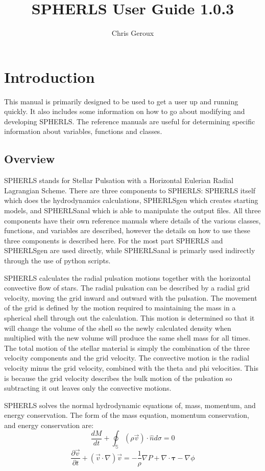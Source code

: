 \documentclass[12pt,a4paper]{book}
\title{SPHERLS User Guide 1.0.3}
\author{Chris Geroux}
\begin{document}
\maketitle
\chapter{Introduction}
\label{chap:introduction}
This manual is primarily designed to be used to get a user up and running quickly. It also includes some information on how to go about modifying and developing SPHERLS. The reference manuals are useful for determining specific information about variables, functions and classes.

\section{Overview}
\label{sec:overview}
SPHERLS stands for Stellar Pulsation with a Horizontal Eulerian Radial Lagrangian Scheme. There are three components to SPHERLS: SPHERLS itself which does the hydrodynamics calculations, SPHERLSgen which creates starting models, and SPHERLSanal which is able to manipulate the output files. All three components have their own reference manuals where details of the various classes, functions, and variables are described, however the details on how to use these three components is described here. For the most part SPHERLS and SPHERLSgen are used directly, while SPHERLSanal is primarly used indirectly through the use of python scripts.
  
SPHERLS calculates the radial pulsation motions together with the horizontal convective flow of stars. The radial pulsation can be described by a radial grid velocity, moving the grid inward and outward with the pulsation. The movement of the grid is defined by the motion required to maintaining the mass in a spherical shell through out the calculation. This motion is determined so that it will change the volume of the shell so the newly calculated density when multiplied with the new volume will produce the same shell mass for all times. The total motion of the stellar material is simply the combination of the three velocity components and the grid velocity.  The convective motion is the radial velocity minus the grid velocity, combined with the theta and phi velocities. This is because the grid velocity describes the bulk motion of the pulsation so subtracting it out leaves only the convective motions.

SPHERLS solves the normal hydrodynamic equations of, mass, momentum, and energy conservation. The form of the mass equation, momentum conservation, and energy conservation are:
\begin{equation}
\frac{d M}{d t} + \oint_{\mathbb{S}} \left(\rho\vec v\right)\cdot\hat{n}d\sigma=0
\end{equation}
\begin{equation}
\frac{\partial \vec{v}}{\partial t}+(\vec{v}\cdot\nabla)\vec{v}=-\frac{1}{\rho}\nabla P + \nabla\cdot\mathbf{\tau}-\nabla \phi
\end{equation}
  
\end{document}
